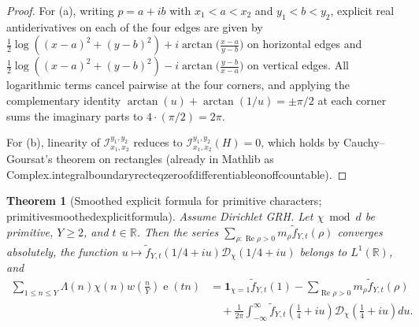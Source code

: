 \documentclass[11pt,reqno]{amsart}
\numberwithin{equation}{section}
\newtheorem{theorem}{Theorem}[section]
\theoremstyle{definition}
\newcommand{\R}{\mathbb{R}}
\newcommand{\1}{\mathbf{1}}
\newcommand{\e}{\operatorname{e}}
\newcommand{\D}{\mathcal{D}}
\renewcommand{\Re}{\operatorname{Re}}
\newcommand{\lean}[1]{{\footnotesize\ttfamily\renewcommand{\_}{\textunderscore\allowbreak}#1}}
\newcommand{\GRH}{\textup{GRH}}
\begin{document}
\begin{proof}
For (a), writing $p = a + ib$ with $x_1 < a < x_2$ and $y_1 < b < y_2$, explicit real antiderivatives on each of the four edges are given by $\frac{1}{2}\log((x-a)^2 + (y-b)^2) + i\arctan\!\bigl(\frac{x-a}{y-b}\bigr)$ on horizontal edges and $\frac{1}{2}\log((x-a)^2 + (y-b)^2) - i\arctan\!\bigl(\frac{y-b}{x-a}\bigr)$ on vertical edges. All logarithmic terms cancel pairwise at the four corners, and applying the complementary identity $\arctan(u) + \arctan(1/u) = \pm\pi/2$ at each corner sums the imaginary parts to $4 \cdot (\pi/2) = 2\pi$.

For (b), linearity of $\mathcal{I}_{x_1, x_2}^{y_1, y_2}$ reduces to $\mathcal{I}_{x_1, x_2}^{y_1, y_2}(H) = 0$, which holds by Cauchy--Goursat's theorem on rectangles (already in Mathlib as \lean{Complex.integral\_boundary\_rect\_eq\_zero\_of\_differentiable\_on\_off\_countable}).
\end{proof}

\begin{theorem}[Smoothed explicit formula for primitive characters; \lean{primitive\_smoothed\_explicit\_formula}]
\label{thm:explicit-formula}
Assume Dirichlet \GRH{}. Let $\chi \bmod d$ be primitive, $Y \ge 2$, and $t \in \R$. Then the series $\sum_{\rho : \Re \rho > 0} m_\rho \widetilde{f}_{Y,t}(\rho)$ converges absolutely, the function $u \mapsto \widetilde{f}_{Y,t}(1/4+iu)\D_\chi(1/4+iu)$ belongs to $L^1(\R)$, and
\begin{align}\label{eq:explicit-formula}
  \sum_{1 \le n \le Y} \Lambda(n)\chi(n) w\!\left(\frac{n}{Y}\right) \e(tn)
  &= \1_{\chi=1} \widetilde{f}_{Y,t}(1)
    - \sum_{\Re \rho > 0} m_\rho \widetilde{f}_{Y,t}(\rho) \nonumber\\
  &\quad + \frac{1}{2\pi} \int_{-\infty}^\infty \widetilde{f}_{Y,t}\!\left(\tfrac{1}{4}+iu\right) \D_\chi\!\left(\tfrac{1}{4}+iu\right) du.
\end{align}
\end{theorem}
\end{document}
